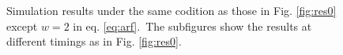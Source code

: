 \documentclass[a4paper,12pt, oneside]{book}
\begin{document}
\begin{figure}[tbp]
 \caption{Simulation results under the same codition as those in Fig. \ref{fig:res0} except $w = 2$ in eq. \ref{eq:arf}.~The subfigures show the results at different timings as in Fig. \ref{fig:res0}.}
 \label{fig:res1}
\end{figure}
\end{document}
